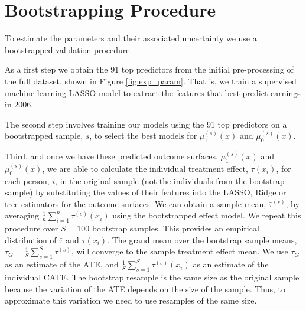 \documentclass[12pt, a4paper]{article}
\begin{document}
\clearpage

\section{Bootstrapping Procedure}
\label{app:boot}

To estimate the parameters and their associated uncertainty we use a bootstrapped validation procedure.

As a first step we obtain the 91 top predictors from the initial
pre-processing of the full dataset, shown in Figure \ref{fig:exp_param}. That
is, we train a supervised machine learning LASSO model to extract the features
that best predict earnings in 2006.

The second step involves training our models using the 91 top predictors on a
bootstrapped sample, $s$, to select the best models for $\mu^{(s)}_1(x)$ and
$\mu^{(s)}_0(x)$. 

Third, and once we have these predicted outcome surfaces, $\mu^{(s)}_1(x)$ and
$\mu^{(s)}_0(x)$, we are able to calculate the individual treatment effect,
$\tau(x_i)$, for each person, $i$, in the original sample (not the individuals
from the bootstrap sample) by substituting the values of their features into
the LASSO, Ridge or tree estimators for the outcome surfaces. We can obtain a
sample mean, $\bar{\tau}^{(s)}$, by averaging
$\frac{1}{n}\sum^n_{i{=}1}\tau^{(s)}(x_i)$ using the bootstrapped effect model.
We repeat this procedure over $S=100$ bootstrap samples. This provides an
empirical distribution of $\bar{\tau}$ and $\tau(x_i)$. The grand mean over the
bootstrap sample means, $\bar{\tau}_G = \frac{1}{S} \sum^S_{s{=1}}
\bar{\tau}^{(s)}$, will converge to the sample treatment effect mean. We use
$\bar{\tau}_G$ as an estimate of the ATE, and $\frac{1}{S} \sum^S_{s{=}1}
\tau^{(s)}(x_i)$ as an estimate of the individual CATE. The bootstrap resample
is the same size as the original sample because the variation of the ATE
depends on the size of the sample. Thus, to approximate this variation we need
to use resamples of the same size.
\end{document}
